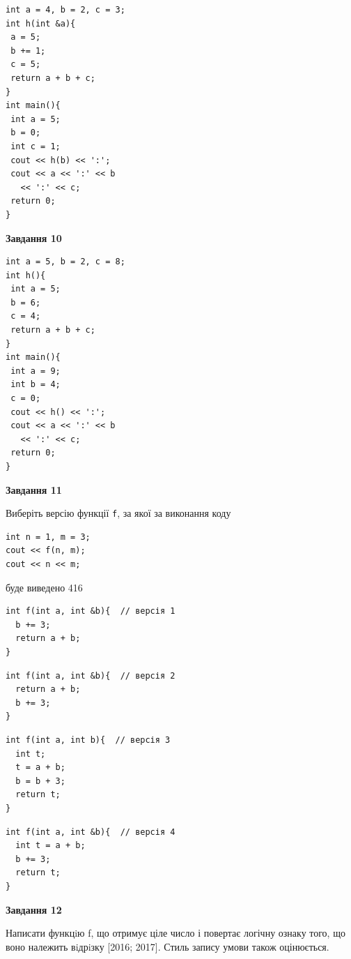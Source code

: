 \documentclass[12pt, ukrainian]{article}
\def\code#1{\Verb!#1!}
\begin{document}
{\begin {large}
\begin{minipage}[t]{7.0cm}
\begin{verbatim}
int a = 4, b = 2, c = 3;
int h(int &a){
 a = 5;
 b += 1;
 c = 5;
 return a + b + c;
}
int main(){
 int a = 5;
 b = 0;
 int c = 1;
 cout << h(b) << ':';
 cout << a << ':' << b 
   << ':' << c;
 return 0;
}
\end{verbatim}



\begin{center}
\textbf{Завдання 10}
\end{center}
\vspace{-8mm}

\begin{verbatim}
int a = 5, b = 2, c = 8;
int h(){
 int a = 5;
 b = 6;
 c = 4;
 return a + b + c;
}
int main(){
 int a = 9;
 int b = 4;
 c = 0;
 cout << h() << ':';
 cout << a << ':' << b 
   << ':' << c;
 return 0;
}
\end{verbatim}

\end{minipage}
\vline \hspace{1mm}
\begin{minipage}[t]{11.0cm}

\begin{center}
\textbf{Завдання 11}
\end{center}
Виберіть версію функції \code{f}, за якої за виконання коду
\begin{verbatim}
int n = 1, m = 3;
cout << f(n, m);
cout << n << m;
\end{verbatim}

буде виведено 416

\begin{verbatim}
int f(int a, int &b){  // версія 1
  b += 3;
  return a + b;
}
\end{verbatim}

\vspace{-8mm}\begin{verbatim}
int f(int a, int &b){  // версія 2
  return a + b;
  b += 3;
}
\end{verbatim}

\vspace{-8mm}\begin{verbatim}
int f(int a, int b){  // версія 3
  int t;
  t = a + b;
  b = b + 3;
  return t;
}
\end{verbatim}

\vspace{-8mm}\begin{verbatim}
int f(int a, int &b){  // версія 4
  int t = a + b;
  b += 3;
  return t;
}
\end{verbatim}



\begin{center}
\textbf{Завдання 12}
\end{center}

Написати функцiю f, що отримує ціле число і повертає логічну ознаку того, що воно належить вiдрiзку [2016; 2017]. Стиль запису умови також оцінюється.\par

\end{minipage}

\end {large}}
\end{document}
